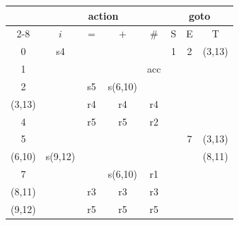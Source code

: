 \documentclass{jarticle}
\begin{document}
\begin{tabular}{|c||c|c|c|c|c|c|c|}\hline
      & \multicolumn{4}{c|}{{\sf action}} & \multicolumn{3}{c|}{{\sf goto}}\\\cline{2-8}
      & $i$ & $=$ & $+$ & $\#$ & S & E & T \\\hline\hline
  0   & s4  &     &     &      & 1 & 2 & (3,13) \\\hline
  1   &     &     &     & acc  &   &   &        \\\hline
  2   &     & s5  & s(6,10) &  &   &   &        \\\hline
(3,13)&     & r4  & r4  & r4   &   &   &        \\\hline
  4   &     & r5  & r5  & r2   &   &   &        \\\hline
  5   &     &     &     &      &   & 7 & (3,13) \\\hline
(6,10)& s(9,12) & &     &      &   &   & (8,11) \\\hline
  7   &     &     & s(6,10) & r1 & &   &        \\\hline
(8,11)&     & r3  & r3  & r3   &   &   &        \\\hline
(9,12)&     & r5  & r5  & r5   &   &   &        \\\hline
\end{tabular}
\end{document}
